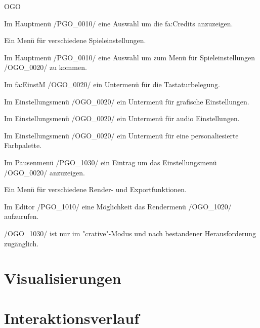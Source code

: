 \begin{ids}{\gls{OGO}}

	\id[0010] Im Hauptmenü /PGO\_0010/ eine Auswahl um die \gls{fa:Credits} anzuzeigen.
	
	\id[0020] Ein Menü für verschiedene Spieleinstellungen.
	
	\id[0030] Im Hauptmenü /PGO\_0010/ eine Auswahl um zum Menü für Spieleinstellungen /OGO\_0020/ zu kommen.
	
	\id[0040] Im \gls{fa:EinstM} /OGO\_0020/ ein Untermenü für die Tastaturbelegung.
	
	\id[0050] Im Einstellungsmenü /OGO\_0020/ ein Untermenü für grafische Einstellungen.
	
	\id[0060] Im Einstellungsmenü /OGO\_0020/ ein Untermenü für audio Einstellungen.
	
	\id[0070] Im Einstellungsmenü /OGO\_0020/ ein Untermenü für eine personaliesierte Farbpalette.
	
	\id[1010] Im Pausenmenü /PGO\_1030/ ein Eintrag um das Einstellungsmenü /OGO\_0020/ anzuzeigen.
	
	\id[1020] Ein Menü für verschiedene Render- und Exportfunktionen.
	
	\id[1030] Im Editor /PGO\_1010/ eine Möglichkeit das Rendermenü /OGO\_1020/ aufzurufen.
	
	\id[1040] /OGO\_1030/ ist nur im "crative"-Modus und nach bestandener Herausforderung zugänglich.
	
\end{ids}



%
%
%
\clearpage



%
%
%



\section*{Visualisierungen}








\section{Interaktionsverlauf}

